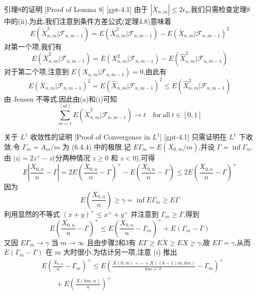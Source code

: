 \documentclass[UTF8]{ctexart}
\begin{document}
    \begin{prf}
        {引理8的证明}
        [Proof of Lemma 8]
        [gpt-4.1]
        由于 $| \tilde { X } _ { n , m } | \leq 2 \epsilon _ { n }$,我们只需检查定理8中的(ii).为此,我们注意到条件方差公式(定理4.8)意味着
\[
E ( \tilde { X } _ { n , m } ^ { 2 } | \mathcal { F } _ { n , m - 1 } ) = E ( \bar { X } _ { n , m } ^ { 2 } | \mathcal { F } _ { n , m - 1 } ) - E ( \bar { X } _ { n , m } | \mathcal { F } _ { n , m - 1 } ) ^ { 2 }
\]
对第一个项,我们有
\[
E ( \bar { X } _ { n , m } ^ { 2 } | \mathcal { F } _ { n , m - 1 } ) = E ( X _ { n , m } ^ { 2 } | \mathcal { F } _ { n , m - 1 } ) - E ( \hat { X } _ { n , m } ^ { 2 } | \mathcal { F } _ { n , m - 1 } )
\]
对于第二个项,注意到 $E ( X _ { n , m } | \mathcal { F } _ { n , m - 1 } ) = 0$,由此有
\[
E ( \bar { X } _ { n , m } | \mathcal { F } _ { n , m - 1 } ) ^ { 2 } = E ( \hat { X } _ { n , m } | \mathcal { F } _ { n , m - 1 } ) ^ { 2 } \leq E ( \hat { X } _ { n , m } ^ { 2 } | \mathcal { F } _ { n , m - 1 } )
\]
由 Jensen 不等式,因此由(a)和(i)可知
\[
\sum _ { m = 1 } ^ { [ n t ] } E ( { \tilde { X } } _ { n , m } ^ { 2 } | { \mathcal { F } } _ { n , m - 1 } ) \to t \quad \mathrm{for~all~} t \in [ 0 , 1 ]
\]

    \end{prf}
    
    
    
    \begin{thm}
        {关于 $L^1$ 收敛性的证明}
        [Proof of Convergence in $L^1$]
        [gpt-4.1]
        只需证明在 $L^1$ 下收敛.令 $\Gamma_m = A_m / m$ 为 (6.4.4) 中的极限,记 $E \Gamma_m = E( X_{0,m} / m )$,并设 $\Gamma = \inf \Gamma_m$.由 $|z| = 2 z^+ - z$(分两种情况 $z \geq 0$ 和 $z < 0$),可得
\[
E \left| \frac{X_{0,n}}{n} - \Gamma \right| = 2 E \left( \frac{X_{0,n}}{n} - \Gamma \right)^+ - E \left( \frac{X_{0,n}}{n} - \Gamma \right) \le 2 E \left( \frac{X_{0,n}}{n} - \Gamma \right)^+
\]
因为
\[
E \left( \frac{X_{0,n}}{n} \right) \ge \gamma = \inf E \Gamma_m \ge E \Gamma
\]
利用显然的不等式 $(x + y)^+ \leq x^+ + y^+$ 并注意到 $\Gamma_m \geq \Gamma$,得到
\[
E \left( \frac{X_{0,n}}{n} - \Gamma \right)^+ \leq E \left( \frac{X_{0,n}}{n} - \Gamma_m \right)^+ + E( \Gamma_m - \Gamma )
\]
又因 $E \Gamma_m \to \gamma$ 当 $m \to \infty$ 且由步骤2和3有 $E \Gamma \geq E \overline{ X } \geq E \underline{ X } \geq \gamma$,故 $E \Gamma = \gamma$,从而 $E( \Gamma_m - \Gamma )$ 在 $m$ 大时很小.为估计另一项,注意 (i) 推出
\[
\begin{aligned}
& E \left( \frac{X_{0,n}}{n} - \Gamma_m \right)^+ \leq E \left( \frac{ X(0, m) + \cdots + X( (k-1)m, k m ) }{ k m + \ell } - \Gamma_m \right)^+ \\
& \qquad + E \left( \frac{ X(k m, n) }{ n } \right)^+
\end{aligned}
\]

    \end{thm}
    
\end{document}
